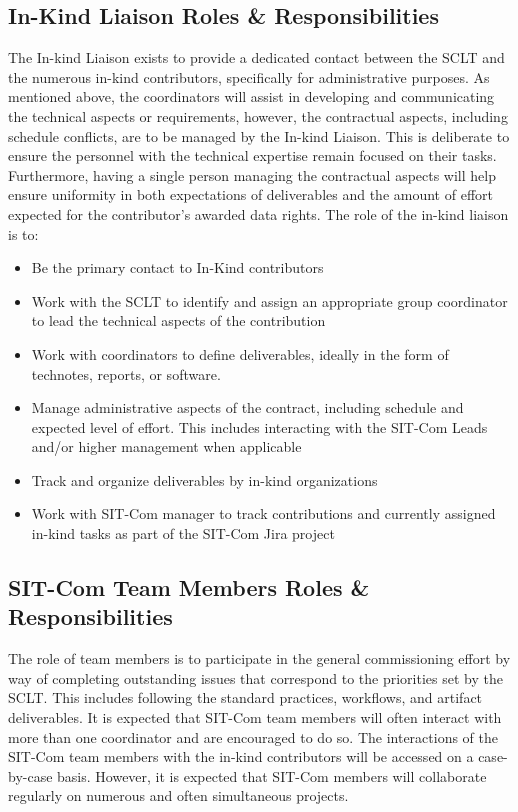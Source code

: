 \documentclass[SE,toc]{lsstdoc}
\begin{document}
\subsection{In-Kind Liaison Roles \& Responsibilities}
The In-kind Liaison exists to provide a dedicated contact between the SCLT and the numerous in-kind contributors, specifically for administrative purposes.
As mentioned above, the coordinators will assist in developing and communicating the technical aspects or requirements, however, the contractual aspects, including schedule conflicts, are to be managed by the In-kind Liaison.
This is deliberate to ensure the personnel with the technical expertise remain focused on their tasks.
Furthermore, having a single person managing the contractual aspects will help ensure uniformity in both expectations of deliverables and the amount of effort expected for the contributor's awarded data rights.
The role of the in-kind liaison is to:
\begin{itemize}
    \item Be the primary contact to In-Kind contributors
    \item Work with the SCLT to identify and assign an appropriate group coordinator to lead the technical aspects of the contribution
    \item Work with coordinators to define deliverables, ideally in the form of technotes, reports, or software.
    \item Manage administrative aspects of the contract, including schedule and expected level of effort.
    This includes interacting with the SIT-Com Leads and/or higher management when applicable
    \item Track and organize deliverables by in-kind organizations
    \item Work with SIT-Com manager to track contributions and currently assigned in-kind tasks as part of the SIT-Com Jira project
\end{itemize}

\subsection{SIT-Com Team Members Roles \& Responsibilities}
The role of team members is to participate in the general commissioning effort by way of completing outstanding issues that correspond to the priorities set by the SCLT.
This includes following the standard practices, workflows, and artifact deliverables.
It is expected that SIT-Com team members will often interact with more than one coordinator and are encouraged to do so.
The interactions of the SIT-Com team members with the in-kind contributors will be accessed on a case-by-case basis.
However, it is expected that SIT-Com members will collaborate regularly on numerous and often simultaneous projects.
\end{document}

